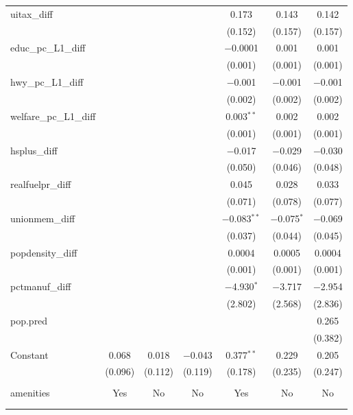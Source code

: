 \begin{table}[!htbp]
\begin{tabular}{@{\extracolsep{5pt}}lcccccc}
  uitax\_diff &  &  &  & 0.173 & 0.143 & 0.142 \\ 
  &  &  &  & (0.152) & (0.157) & (0.157) \\ 
  educ\_pc\_L1\_diff &  &  &  & $-$0.0001 & 0.001 & 0.001 \\ 
  &  &  &  & (0.001) & (0.001) & (0.001) \\ 
  hwy\_pc\_L1\_diff &  &  &  & $-$0.001 & $-$0.001 & $-$0.001 \\ 
  &  &  &  & (0.002) & (0.002) & (0.002) \\ 
  welfare\_pc\_L1\_diff &  &  &  & 0.003$^{**}$ & 0.002 & 0.002 \\ 
  &  &  &  & (0.001) & (0.001) & (0.001) \\ 
  hsplus\_diff &  &  &  & $-$0.017 & $-$0.029 & $-$0.030 \\ 
  &  &  &  & (0.050) & (0.046) & (0.048) \\ 
  realfuelpr\_diff &  &  &  & 0.045 & 0.028 & 0.033 \\ 
  &  &  &  & (0.071) & (0.078) & (0.077) \\ 
  unionmem\_diff &  &  &  & $-$0.083$^{**}$ & $-$0.075$^{*}$ & $-$0.069 \\ 
  &  &  &  & (0.037) & (0.044) & (0.045) \\ 
  popdensity\_diff &  &  &  & 0.0004 & 0.0005 & 0.0004 \\ 
  &  &  &  & (0.001) & (0.001) & (0.001) \\ 
  pctmanuf\_diff &  &  &  & $-$4.930$^{*}$ & $-$3.717 & $-$2.954 \\ 
  &  &  &  & (2.802) & (2.568) & (2.836) \\ 
  pop.pred &  &  &  &  &  & 0.265 \\ 
  &  &  &  &  &  & (0.382) \\ 
  Constant & 0.068 & 0.018 & $-$0.043 & 0.377$^{**}$ & 0.229 & 0.205 \\ 
  & (0.096) & (0.112) & (0.119) & (0.178) & (0.235) & (0.247) \\ 
 \hline \\[-1.8ex] 
amenities & Yes & No & No & Yes & No & No \\ 
\hline \\[-1.8ex] 
\hline 
\hline \\[-1.8ex] 
\end{tabular} 
\end{table} 
